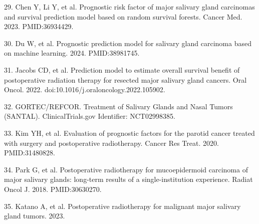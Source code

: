 \documentclass[10pt,twocolumn]{article}
\begin{document}
29. Chen Y, Li Y, et al. Prognostic risk factor of major salivary gland carcinomas and survival prediction model based on random survival forests. Cancer Med. 2023. PMID:36934429.\par
30. Du W, et al. Prognostic prediction model for salivary gland carcinoma based on machine learning. 2024. PMID:38981745.\par
31. Jacobs CD, et al. Prediction model to estimate overall survival benefit of postoperative radiation therapy for resected major salivary gland cancers. Oral Oncol. 2022. doi:10.1016/j.oraloncology.2022.105902.\par
32. GORTEC/REFCOR. Treatment of Salivary Glands and Nasal Tumors (SANTAL). ClinicalTrials.gov Identifier: NCT02998385.\par
33. Kim YH, et al. Evaluation of prognostic factors for the parotid cancer treated with surgery and postoperative radiotherapy. Cancer Res Treat. 2020. PMID:31480828.\par
34. Park G, et al. Postoperative radiotherapy for mucoepidermoid carcinoma of major salivary glands: long-term results of a single-institution experience. Radiat Oncol J. 2018. PMID:30630270.\par
35. Katano A, et al. Postoperative radiotherapy for malignant major salivary gland tumors. 2023.\par
\end{document}

